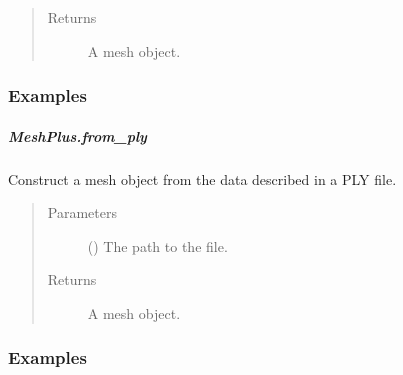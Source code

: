\documentclass[letterpaper,10pt,english]{sphinxmanual}
\begin{document}
\begin{fulllineitems}
\begin{fulllineitems}
\begin{quote}
\begin{description}
\item[{Returns}] \leavevmode
{} \textendash{} A mesh object.

\end{description}\end{quote}
\subsubsection*{Examples}

\begin{sphinxVerbatim}[commandchars=\\\{\}]
\end{sphinxVerbatim}

\end{fulllineitems}



\subparagraph{MeshPlus.from\_ply}
\label{\detokenize{api/generated/directional_clustering.mesh.MeshPlus.from_ply:meshplus-from-ply}}\label{\detokenize{api/generated/directional_clustering.mesh.MeshPlus.from_ply::doc}}

\begin{fulllineitems}
\label{\detokenize{api/generated/directional_clustering.mesh.MeshPlus.from_ply:directional_clustering.mesh.MeshPlus.from_ply}}
Construct a mesh object from the data described in a PLY file.
\begin{quote}\begin{description}
\item[{Parameters}] \leavevmode
{} () \textendash{} The path to the file.

\item[{Returns}] \leavevmode
{} \textendash{} A mesh object.

\end{description}\end{quote}
\subsubsection*{Examples}


\end{fulllineitems}
\end{fulllineitems}
\end{document}
